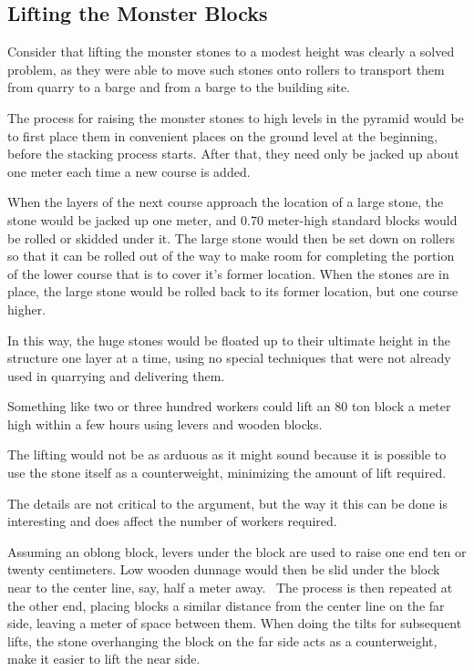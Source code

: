 \documentclass[letterpaper,11pt]{article}
\begin{document}
\subsection{ Lifting the Monster Blocks }

Consider that lifting the monster stones to a modest height was clearly a solved problem, as they were able to move such stones onto 
rollers to transport them from quarry to a barge and from a barge to the building site.  

The process for raising the monster stones to high levels in the pyramid would be to first place them in convenient places on the ground level 
at the beginning, before the stacking process starts. 
After that, they need only be jacked up about one meter each time a new course is added.

When the layers of the next course approach the location of a large stone, the stone would be jacked up one meter, and 0.70 meter-high standard 
blocks would be rolled or skidded under it. 
The large stone would then be set down on rollers so that it can be rolled out of the way to make room for completing the portion of the lower course that is to 
cover it's former location. 
When the stones are in place, the large stone would be rolled back to its former location, but one course higher.

In this way, the huge stones would be floated up to their ultimate height in the structure one layer at a time, using no special techniques that were 
not already used in quarrying and delivering them. 

Something like two or three hundred workers could lift an 80 ton block a meter high within a few hours using levers and wooden blocks. 

The lifting would not be as arduous as it might sound because it is possible to use the stone itself as a counterweight, 
minimizing the amount of lift required.

The details are not critical to the argument, but the way it this can be done is interesting and does affect the number of workers required.

Assuming an oblong block, levers under the block are used to raise one end ten or twenty centimeters. 
Low wooden dunnage would then be slid under the block near to the center line, say, half a meter away.  
The process is then repeated at the other end, placing blocks a similar distance from the center line on the far side, leaving a meter of space between them. 
When doing the tilts for subsequent lifts, the stone overhanging the block on the far side acts as a counterweight, make it 
easier to lift the near side.
\end{document}
